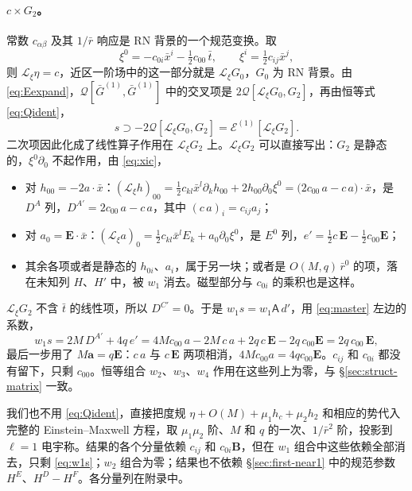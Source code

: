 \documentclass[11pt,a4paper]{ctexart}
\begin{document}
\paragraph{$c\times G_2$。}常数 $c_{\alpha\beta}$ 及其 $1/\bar r$ 响应是 RN 背景的一个规范变换。取
\begin{equation}
\xi^0=-c_{0i}\bar x^i-\tfrac12c_{00}\,\bar t,\qquad \xi^i=\tfrac12c_{ij}\bar x^j,
\label{eq:xic}
\end{equation}
则 $\mathcal L_\xi\eta=c$，近区一阶场中的这一部分就是 $\mathcal L_\xi G_0$，$G_0$ 为 RN 背景。由 \eqref{eq:Eexpand}，$\mathcal Q[\bar G^{(1)},\bar G^{(1)}]$ 中的交叉项是 $2\mathcal Q[\mathcal L_\xi G_0,G_2]$，再由恒等式 \eqref{eq:Qident}，
\begin{equation*}
s\supset-2\mathcal Q[\mathcal L_\xi G_0,G_2]=\mathcal E^{(1)}[\mathcal L_\xi G_2].
\end{equation*}
二次项因此化成了线性算子作用在 $\mathcal L_\xi G_2$ 上。$\mathcal L_\xi G_2$ 可以直接写出：$G_2$ 是静态的，$\xi^0\partial_0$ 不起作用，由 \eqref{eq:xic}，
\begin{itemize}[nosep]
\item 对 $h_{00}=-2a\cdot\bar x$：$(\mathcal L_\xi h)_{00}=\tfrac12c_{kl}\bar x^l\partial_kh_{00}+2h_{00}\partial_0\xi^0=\big(2c_{00}\,a-c\,a\big)\cdot\bar x$，是 $D^A$ 列，$D^{A\prime}=2c_{00}\,a-c\,a$，其中 $(c\,a)_i=c_{ij}a_j$；
\item 对 $a_0=\boldsymbol E\cdot\bar x$：$(\mathcal L_\xi a)_0=\tfrac12c_{kl}\bar x^lE_k+a_0\partial_0\xi^0$，是 $E^0$ 列，$e'=\tfrac12c\,\boldsymbol E-\tfrac12c_{00}\boldsymbol E$；
\item 其余各项或者是静态的 $h_{0i}$、$a_i$，属于另一块；或者是 $O(M,q)\,\bar r^0$ 的项，落在未知列 $H$、$H'$ 中，被 $w_1$ 消去。磁型部分与 $c_{0i}$ 的乘积也是这样。
\end{itemize}
$\mathcal L_\xi G_2$ 不含 $\bar t$ 的线性项，所以 $D^{C\prime}=0$。于是 $w_1s=w_1\mathsf A\,d'$，用 \eqref{eq:master} 左边的系数，
\begin{equation}
w_1s=2M\,D^{A\prime}+4q\,e'=4Mc_{00}\,a-2M\,c\,a+2q\,c\,\boldsymbol E-2q\,c_{00}\boldsymbol E=2q\,c_{00}\,\boldsymbol E ,
\label{eq:w1s}
\end{equation}
最后一步用了 $M\boldsymbol a=q\boldsymbol E$：$c\,a$ 与 $c\,\boldsymbol E$ 两项相消，$4Mc_{00}a=4qc_{00}\boldsymbol E$。$c_{ij}$ 和 $c_{0i}$ 都没有留下，只剩 $c_{00}$。恒等组合 $w_2$、$w_3$、$w_4$ 作用在这些列上为零，与 \S\ref{sec:struct-matrix} 一致。

我们也不用 \eqref{eq:Qident}，直接把度规 $\eta+O(M)+\mu_1h_c+\mu_2h_2$ 和相应的势代入完整的 Einstein--Maxwell 方程，取 $\mu_1\mu_2$ 阶、$M$ 和 $q$ 的一次、$1/\bar r^2$ 阶，投影到 $\ell=1$ 电宇称。结果的各个分量依赖 $c_{ij}$ 和 $c_{0i}\boldsymbol B$，但在 $w_1$ 组合中这些依赖全部消去，只剩 \eqref{eq:w1s}；$w_2$ 组合为零；结果也不依赖 \S\ref{sec:first-near1} 中的规范参数 $H^E$、$H^D-H^F$。各分量列在附录中。
\end{document}
